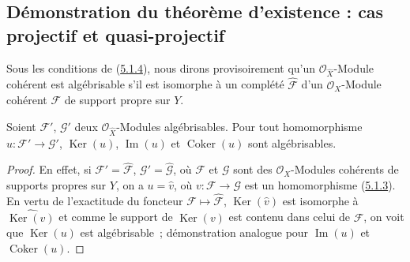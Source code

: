 \subsection{Démonstration du théorème d'existence : cas projectif et quasi-projectif}
\label{subsection:III.5.2-fr}

\begin{env}[5.2.1]
\label{III.5.2.1-fr}
Sous les conditions de (\hyperref[III.5.1.4-fr]{5.1.4}), nous dirons provisoirement
qu'un $\mathcal O_{\widehat X}$-Module cohérent est algébrisable s'il est isomorphe
à un complété $\widehat{\mathcal F}$ d'un $\mathcal O_X$-Module cohérent
$\mathcal F$ de support propre sur $Y$.
\end{env}

\begin{lemma}[5.2.2]
\label{III.5.2.2-fr}
Soient $\mathcal F'$, $\mathcal G'$ deux $\mathcal O_{\widehat X}$-Modules
algébrisables. Pour tout homomorphisme $u:\mathcal F'\to\mathcal G'$,
$\operatorname{Ker}(u)$, $\operatorname{Im}(u)$ et $\operatorname{Coker}(u)$ sont
algébrisables.
\end{lemma}

\begin{proof}
En effet, si $\mathcal F'=\widehat{\mathcal F}$,
$\mathcal G'=\widehat{\mathcal G}$, où $\mathcal F$ et $\mathcal G$ sont des
$\mathcal O_X$-Modules cohérents de supports propres sur $Y$, on a
$u=\widehat v$, où $v:\mathcal F\to\mathcal G$ est un homomorphisme
(\hyperref[III.5.1.3-fr]{5.1.3}). En vertu de l'exactitude du foncteur
$\mathcal F\mapsto\widehat{\mathcal F}$,
$\operatorname{Ker}(\widehat v)$ est isomorphe à
$\widehat{\operatorname{Ker}(v)}$ et comme le support de
$\operatorname{Ker}(v)$ est contenu dans celui de $\mathcal F$, on voit que
$\operatorname{Ker}(u)$ est algébrisable~; démonstration analogue pour
$\operatorname{Im}(u)$ et $\operatorname{Coker}(u)$.
\end{proof}

